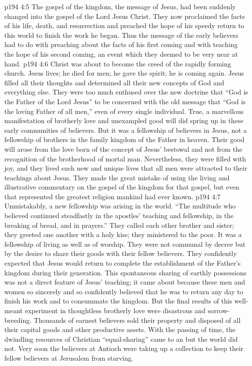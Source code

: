 \vs p194 4:5 The gospel of the kingdom, the message of Jesus, had been suddenly changed into the gospel of the Lord Jesus Christ. They now proclaimed the facts of his life, death, and resurrection and preached the hope of his speedy return to this world to finish the work he began. Thus the message of the early believers had to do with preaching about the facts of his first coming and with teaching the hope of his second coming, an event which they deemed to be very near at hand.
\vs p194 4:6 Christ was about to become the creed of the rapidly forming church. Jesus lives; he died for men; he gave the spirit; he is coming again. Jesus filled all their thoughts and determined all their new concepts of God and everything else. They were too much enthused over the new doctrine that “God is the Father of the Lord Jesus” to be concerned with the old message that “God is the loving Father of all men,” even of every single individual. True, a marvellous manifestation of brotherly love and unexampled good will did spring up in these early communities of believers. But it was a fellowship of believers in Jesus, not a fellowship of brothers in the family kingdom of the Father in heaven. Their good will arose from the love born of the concept of Jesus’ bestowal and not from the recognition of the brotherhood of mortal man. Nevertheless, they were filled with joy, and they lived such new and unique lives that all men were attracted to their teachings about Jesus. They made the great mistake of using the living and illustrative commentary on the gospel of the kingdom for that gospel, but even that represented the greatest religion mankind had ever known.
\vs p194 4:7 Unmistakably, a new fellowship was arising in the world. “The multitude who believed continued steadfastly in the apostles’ teaching and fellowship, in the breaking of bread, and in prayers.” They called each other brother and sister; they greeted one another with a holy kiss; they ministered to the poor. It was a fellowship of living as well as of worship. They were not communal by decree but by the desire to share their goods with their fellow believers. They confidently expected that Jesus would return to complete the establishment of the Father’s kingdom during their generation. This spontaneous sharing of earthly possessions was not a direct feature of Jesus’ teaching; it came about because these men and women so sincerely and so confidently believed that he was to return any day to finish his work and to consummate the kingdom. But the final results of this well\hyp{}meant experiment in thoughtless brotherly love were disastrous and sorrow\hyp{}breeding. Thousands of earnest believers sold their property and disposed of all their capital goods and other productive assets. With the passing of time, the dwindling resources of Christian “equal\hyp{}sharing” came to an  but the world did not. Very soon the believers at Antioch were taking up a collection to keep their fellow believers at Jerusalem from starving.
